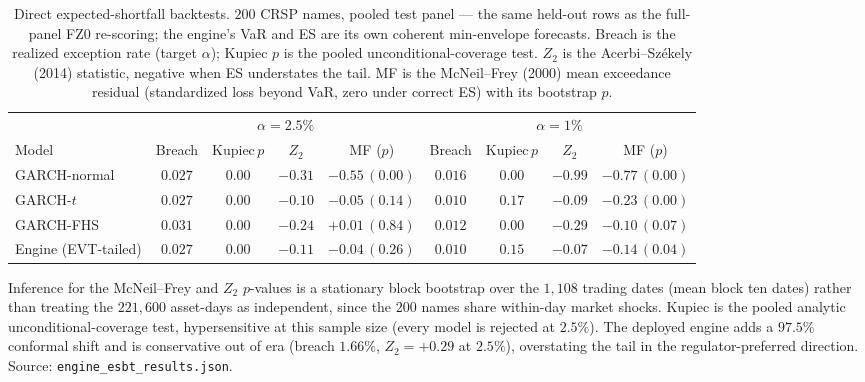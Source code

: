 \documentclass[11pt]{article}
\begin{document}
\begin{table}[t]
\centering
\begin{threeparttable}
\caption{Direct expected-shortfall backtests. $200$ CRSP names, pooled test
panel --- the same held-out rows as the full-panel FZ0 re-scoring; the engine's
VaR and ES are its own coherent min-envelope forecasts. Breach is the realized
exception rate (target $\alpha$); Kupiec $p$ is the pooled unconditional-coverage
test. $Z_2$ is the Acerbi--Sz\'ekely (2014) statistic, negative when ES
understates the tail. MF is the McNeil--Frey (2000) mean exceedance residual
(standardized loss beyond VaR, zero under correct ES) with its bootstrap $p$.}
\label{tab:esbt}
\small\setlength{\tabcolsep}{5pt}
\begin{tabular}{lcccc|cccc}
\toprule
 & \multicolumn{4}{c}{$\alpha=2.5\%$} & \multicolumn{4}{c}{$\alpha=1\%$}\\
\cmidrule(lr){2-5}\cmidrule(lr){6-9}
Model & Breach & Kupiec\,$p$ & $Z_2$ & MF ($p$) & Breach & Kupiec\,$p$ & $Z_2$ & MF ($p$) \\
\midrule
GARCH-normal & $0.027$ & $0.00$ & $-0.31$ & $-0.55\,(0.00)$ & $0.016$ & $0.00$ & $-0.99$ & $-0.77\,(0.00)$ \\
GARCH-$t$ & $0.027$ & $0.00$ & $\mathbf{-0.10}$ & $-0.05\,(0.14)$ & $0.010$ & $\mathbf{0.17}$ & $-0.09$ & $-0.23\,(0.00)$ \\
GARCH-FHS & $0.031$ & $0.00$ & $-0.24$ & $\mathbf{+0.01\,(0.84)}$ & $0.012$ & $0.00$ & $-0.29$ & $\mathbf{-0.10\,(0.07)}$ \\
Engine (EVT-tailed) & $0.027$ & $0.00$ & $-0.11$ & $-0.04\,(0.26)$ & $0.010$ & $\mathbf{0.15}$ & $\mathbf{-0.07}$ & $-0.14\,(0.04)$ \\
\bottomrule
\end{tabular}
\begin{tablenotes}\footnotesize
\item Inference for the McNeil--Frey and $Z_2$ $p$-values is a stationary block
bootstrap over the $1{,}108$ trading dates (mean block ten dates) rather than
treating the $221{,}600$ asset-days as independent, since the $200$ names share
within-day market shocks. Kupiec is the pooled analytic unconditional-coverage
test, hypersensitive at this sample size (every model is rejected at $2.5\%$).
The deployed engine adds a $97.5\%$ conformal shift and is conservative out of
era (breach $1.66\%$, $Z_2=+0.29$ at $2.5\%$), overstating the tail in the
regulator-preferred direction. Source: \texttt{engine\_esbt\_results.json}.
\end{tablenotes}
\end{threeparttable}
\end{table}
\end{document}
